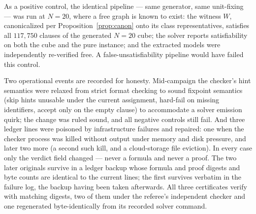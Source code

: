 \documentclass[11pt]{amsart}
\theoremstyle{plain}
\theoremstyle{definition}
\theoremstyle{remark}
\begin{document}
As a positive control, the identical pipeline --- same generator, same
unit-fixing --- was run at $N=20$, where a free graph is known to exist:
the witness $W$, canonicalized per Proposition~\ref{prop:canon} onto its
class representatives, satisfies all $117{,}750$ clauses of the
generated $N=20$ cube; the solver reports satisfiability on both the
cube and the pure instance; and the extracted models were independently
re-verified free. A false-unsatisfiability pipeline would have failed
this control.

Two operational events are recorded for honesty. Mid-campaign the
checker's hint semantics were relaxed from strict format checking to
sound fixpoint semantics (skip hints unusable under the current
assignment, hard-fail on missing identifiers, accept only on the empty
clause) to accommodate a solver emission quirk; the change was ruled
sound, and all negative controls still fail. And three ledger lines were
poisoned by infrastructure failures and repaired: one when the checker
process was killed without output under memory and disk pressure, and
later two more (a second such kill, and a cloud-storage file eviction).
In every case only the verdict field changed --- never a formula and
never a proof. The two later originals survive in a ledger backup whose
formula and proof digests and byte counts are identical to the current
lines; the first survives verbatim in the failure log, the backup having
been taken afterwards. All three certificates verify with matching
digests, two of them under the referee's independent checker and one
regenerated byte-identically from its recorded solver command.
\end{document}
